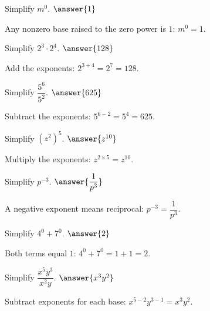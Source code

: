 \documentclass{ximera}
\begin{document}
\begin{problem}
Simplify $m^0$. $\answer{1}$
\begin{feedback}
Any nonzero base raised to the zero power is $1$: $m^0 = 1$.
\end{feedback}
\end{problem}

\begin{problem}
Simplify $2^3 \cdot 2^4$. $\answer{128}$
\begin{feedback}
Add the exponents: $2^{3+4} = 2^7 = 128$.
\end{feedback}
\end{problem}

\begin{problem}
Simplify $\dfrac{5^6}{5^2}$. $\answer{625}$
\begin{feedback}
Subtract the exponents: $5^{6-2} = 5^4 = 625$.
\end{feedback}
\end{problem}

\begin{problem}
Simplify $(z^2)^5$. $\answer{z^{10}}$
\begin{feedback}
Multiply the exponents: $z^{2 \times 5} = z^{10}$.
\end{feedback}
\end{problem}

\begin{problem}
Simplify $p^{-3}$. $\answer{\dfrac{1}{p^3}}$
\begin{feedback}
A negative exponent means reciprocal: $p^{-3} = \dfrac{1}{p^3}$.
\end{feedback}
\end{problem}

\begin{problem}
Simplify $4^0 + 7^0$. $\answer{2}$
\begin{feedback}
Both terms equal $1$: $4^0 + 7^0 = 1 + 1 = 2$.
\end{feedback}
\end{problem}

\begin{problem}
Simplify $\dfrac{x^5 y^3}{x^2 y}$. $\answer{x^3 y^2}$
\begin{feedback}
Subtract exponents for each base: $x^{5-2} y^{3-1} = x^3 y^2$.
\end{feedback}
\end{problem}

\end{document}
